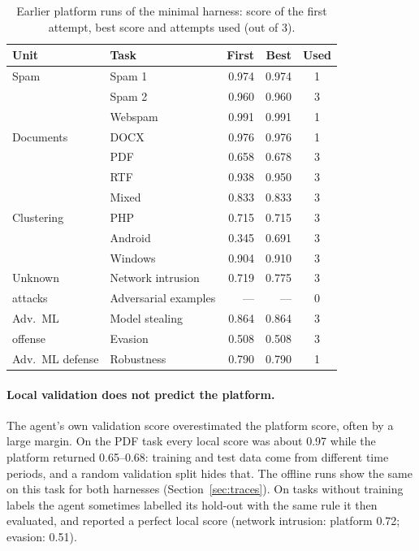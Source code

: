 \documentclass[letterpaper,twocolumn,10pt]{article}
\begin{document}
\begin{table}[t]
\centering
\footnotesize
\setlength{\tabcolsep}{3pt}
\begin{tabular}{@{}llrrc@{}}
\toprule
Unit & Task & First & Best & Used \\
\midrule
Spam      & Spam 1                     & 0.974 & 0.974 & 1 \\
          & Spam 2                     & 0.960 & 0.960 & 3 \\
          & Webspam                    & 0.991 & 0.991 & 1 \\
\midrule
Documents & DOCX                       & 0.976 & 0.976 & 1 \\
          & PDF                        & 0.658 & 0.678 & 3 \\
          & RTF                        & 0.938 & 0.950 & 3 \\
          & Mixed                      & 0.833 & 0.833 & 3 \\
\midrule
Clustering & PHP                       & 0.715 & 0.715 & 3 \\
          & Android                    & 0.345 & 0.691 & 3 \\
          & Windows                    & 0.904 & 0.910 & 3 \\
\midrule
Unknown   & Network intrusion          & 0.719 & 0.775 & 3 \\
attacks   & Adversarial examples       & ---   & ---   & 0 \\
\midrule
Adv.\ ML  & Model stealing             & 0.864 & 0.864 & 3 \\
offense   & Evasion                    & 0.508 & 0.508 & 3 \\
\midrule
Adv.\ ML defense & Robustness          & 0.790 & 0.790 & 1 \\
\bottomrule
\end{tabular}
\caption{Earlier platform runs of the minimal harness: score of the first
attempt, best score and attempts used (out of 3).}
\label{tab:minimal}
\end{table}

\paragraph{Local validation does not predict the platform.} The agent's own
validation score overestimated the platform score, often by a large margin.
On the PDF task every local score was about 0.97 while the platform returned
0.65--0.68: training and test data come from different time periods, and a
random validation split hides that. The offline runs show the same on this task for both harnesses
(Section~\ref{sec:traces}). On tasks
without training labels the agent sometimes labelled its hold-out with the
same rule it then evaluated, and reported a perfect local score (network
intrusion: platform 0.72; evasion: 0.51).
\end{document}
